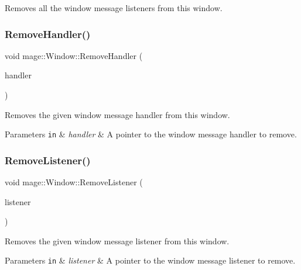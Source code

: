 Removes all the window message listeners from this window. \mbox{\label{classmage_1_1_window_a81b23a696f73636ec9aa985ceda391b4}} 
\subsubsection{\texorpdfstring{Remove\+Handler()}{RemoveHandler()}}
{\footnotesize\ttfamily void mage\+::\+Window\+::\+Remove\+Handler (\begin{DoxyParamCaption}\item[{\mbox{\hyperlink{classmage_1_1_window_add1d792fb9f71e70d4fb07409d80cfdd}{Window\+Message\+Handler\+Ptr}}}]{handler }\end{DoxyParamCaption})}

Removes the given window message handler from this window.


\begin{DoxyParams}[1]{Parameters}
\mbox{\tt in}  & {\em handler} & A pointer to the window message handler to remove. \\
\hline
\end{DoxyParams}
\mbox{\label{classmage_1_1_window_a0f30903e406cf3cde3682befafcd3eba}} 
\subsubsection{\texorpdfstring{Remove\+Listener()}{RemoveListener()}}
{\footnotesize\ttfamily void mage\+::\+Window\+::\+Remove\+Listener (\begin{DoxyParamCaption}\item[{\mbox{\hyperlink{classmage_1_1_window_a0e0a4f2a3f6db176f6aec454b94a06fb}{Window\+Message\+Listener\+Ptr}}}]{listener }\end{DoxyParamCaption})}

Removes the given window message listener from this window.


\begin{DoxyParams}[1]{Parameters}
\mbox{\tt in}  & {\em listener} & A pointer to the window message listener to remove. \\
\hline
\end{DoxyParams}
\mbox{\label{classmage_1_1_window_a7f5e2e528eb26bf6750131a1d72db28e}} 
